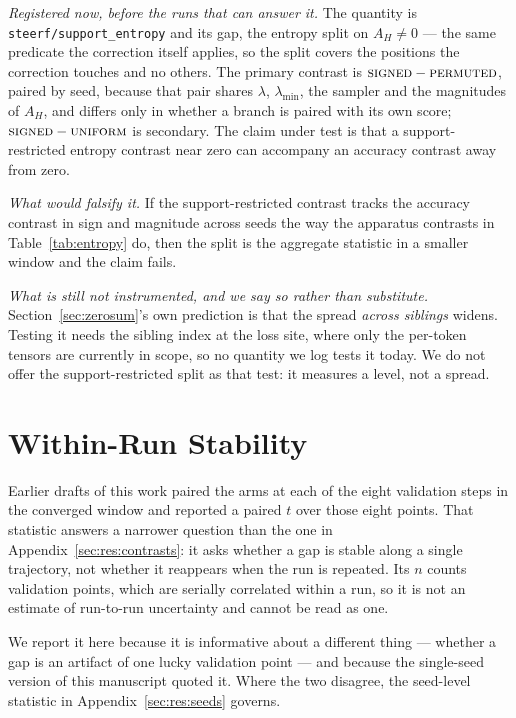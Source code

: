 \documentclass[11pt]{article}
\newcommand{\AH}{A_{H}}
\begin{document}
\emph{Registered now, before the runs that can answer it.} The quantity is
\texttt{steerf/support\_entropy} and its gap, the entropy split on $\AH \ne 0$ ---
the same predicate the correction itself applies, so the split covers the positions
the correction touches and no others. The primary contrast is
$\textsc{signed} - \textsc{permuted}$, paired by seed, because that pair shares
$\lambda$, $\lambda_{\min}$, the sampler and the magnitudes of $\AH$, and differs
only in whether a branch is paired with its own score;
$\textsc{signed} - \textsc{uniform}$ is secondary. The claim under test is that a
support-restricted entropy contrast near zero can accompany an accuracy contrast away
from zero.

\emph{What would falsify it.} If the support-restricted contrast tracks the accuracy
contrast in sign and magnitude across seeds the way the apparatus contrasts in
Table~\ref{tab:entropy} do, then the split is the aggregate statistic in a smaller
window and the claim fails.

\emph{What is still not instrumented, and we say so rather than substitute.}
Section~\ref{sec:zerosum}'s own prediction is that the spread \emph{across siblings}
widens. Testing it needs the sibling index at the loss site, where only the
per-token tensors are currently in scope, so no quantity we log tests it today. We
do not offer the support-restricted split as that test: it measures a level, not a
spread.

\section{Within-Run Stability}
\label{sec:appendix-within}

Earlier drafts of this work paired the arms at each of the eight validation steps in
the converged window and reported a paired $t$ over those eight points. That
statistic answers a narrower question than the one in
Appendix~\ref{sec:res:contrasts}: it asks whether a gap is stable along a single
trajectory, not whether it reappears when the run is repeated. Its $n$ counts
validation points, which are serially correlated within a run, so it is not an
estimate of run-to-run uncertainty and cannot be read as one.

We report it here because it is informative about a different thing --- whether a gap
is an artifact of one lucky validation point --- and because the single-seed version
of this manuscript quoted it. Where the two disagree, the seed-level statistic in
Appendix~\ref{sec:res:seeds} governs.
\end{document}
